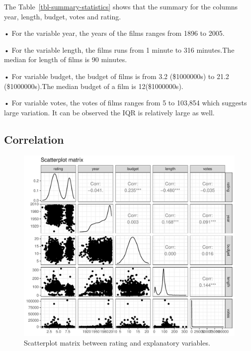 \documentclass[
  letterpaper,
  DIV=11,
  numbers=noendperiod]{scrartcl}
\begin{document}
The Table~\ref{tbl-summary-statistics} shows that the summary for the
columns year, length, budget, votes and rating.

• For the variable year, the years of the films ranges from 1896 to
2005.

• For the variable length, the films runs from 1 minute to 316
minutes.The median for length of films is 90 minutes.

• For variable budget, the budget of films is from 3.2 (\$1000000s) to
21.2 (\$1000000s).The median budget of a film is 12(\$1000000s).

• For variable votes, the votes of films ranges from 5 to 103,854 which
suggests large variation. It can be observed the IQR is relatively large
as well.

\clearpage

\hypertarget{sec-cor}{%
\subsection{Correlation}\label{sec-cor}}

\begin{figure}

{\centering \includegraphics{Group_06_Analysis_files/figure-pdf/fig-scatterplot-matrix-1.pdf}

}

\caption{\label{fig-scatterplot-matrix}Scatterplot matrix between rating
and explanatory variables.}

\end{figure}
\end{document}

